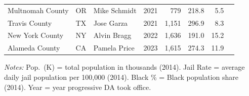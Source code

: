\begin{table}[ht]
\begin{tabular}{llllrrrr}
Multnomah County & OR & Mike Schmidt & 2021 & 779 & 218.8 & 5.5 \\
Travis County & TX & Jose Garza & 2021 & 1,151 & 296.9 & 8.3 \\
New York County & NY & Alvin Bragg & 2022 & 1,636 & 191.0 & 15.2 \\
Alameda County & CA & Pamela Price & 2023 & 1,615 & 274.3 & 11.9 \\
\bottomrule
\end{tabular}
\begin{minipage}{\textwidth}
\vspace{0.5em}
\small \textit{Notes:} Pop.\ (K) = total population in thousands (2014). Jail Rate = average daily jail population per 100,000 (2014). Black \% = Black population share (2014). Year = year progressive DA took office.
\end{minipage}
\end{table}
